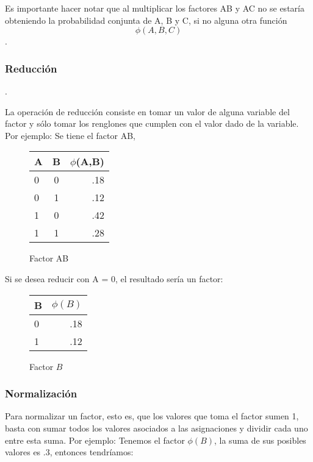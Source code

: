 Es importante hacer notar que al multiplicar los factores AB y AC no se estaría obteniendo la probabilidad conjunta de A, B y C, si no alguna otra función $$\phi(A,B,C)$$. 

\subsubsection{Reducción}
 \parencite[111]{KollerFriedman2009}.

La operación de reducción consiste en tomar un valor de alguna variable del factor y sólo tomar los renglones que cumplen con el valor dado de la variable. Por ejemplo: Se tiene el factor AB,

\begin{figure}[H]
  \begin{center}
    \begin{tabular}{ l  c | r }
      A & B & $\phi$(A,B)\\ \hline
      0 & 0 & .18  \\ \hline
      0 & 1 & .12  \\ \hline
      1 & 0 & .42  \\ \hline
      1 & 1 & .28  \\
    \end{tabular}
  \end{center}
  \caption{Factor AB}
\end{figure}

\noindent Si se desea reducir con A = 0, el resultado sería un factor:

\begin{figure}[h]
  \begin{center}
    \begin{tabular}{ l | r }
      B & \(\phi(B)\)\\ \hline
      0 & .18  \\ \hline
      1 & .12  \\
    \end{tabular}
  \end{center}
  \caption{Factor \(B\)}
\end{figure}

\subsubsection{Normalización}
Para normalizar un factor, esto es, que los valores que toma el factor sumen 1, basta con sumar todos los valores asociados a las asignaciones y dividir cada uno entre esta suma. Por ejemplo: Tenemos el factor \(\phi(B)\), la suma de sus posibles valores es .3, entonces tendríamos:

